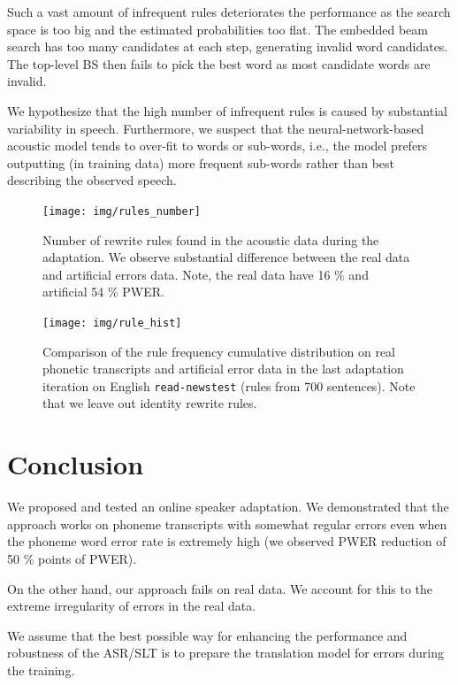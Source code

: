 Such a vast amount of infrequent rules deteriorates the performance as the search space is too big and the estimated probabilities too flat. The embedded beam search has too many candidates at each step, generating invalid word candidates. The top-level BS then fails to pick the best word as most candidate words are invalid.

We hypothesize that the high number of infrequent rules is caused by substantial variability in speech. Furthermore, we suspect that the neural-network-based acoustic model tends to over-fit to words or sub-words, i.e., the model prefers outputting (in training data) more frequent sub-words rather than best describing the observed speech. 

\begin{figure}[h]
    \texttt{[image: img/rules\_number]}
    \caption[Number of rewrite rules found in the acoustic data]{Number of rewrite rules found in the acoustic data during the adaptation. We observe substantial difference between the real data and artificial errors data. Note, the real data have 16 \% and artificial 54 \% PWER.}
    \label{fig:rule_number} 
\end{figure}

\begin{figure}[h]
    \texttt{[image: img/rule\_hist]}
    \caption[Comparison of the rule frequency cumulative distribution]{Comparison of the rule frequency cumulative distribution on real phonetic transcripts and artificial error data in the last adaptation iteration on English \texttt{read-newstest} (rules from 700 sentences). Note that we leave out identity rewrite rules.}
    \label{fig:rule_hist} 
\end{figure}

\section{Conclusion}
\label{oeasr:conclusion}
We proposed and tested an online speaker adaptation. We demonstrated that the approach works on phoneme transcripts with somewhat regular errors even when the phoneme word error rate is extremely high (we observed PWER reduction of 50 \% points of PWER). 

On the other hand, our approach fails on real data. We account for this to the extreme irregularity of errors in the real data. 

We assume that the best possible way for enhancing the performance and robustness of the ASR/SLT is to prepare the translation model for errors during the training. 



